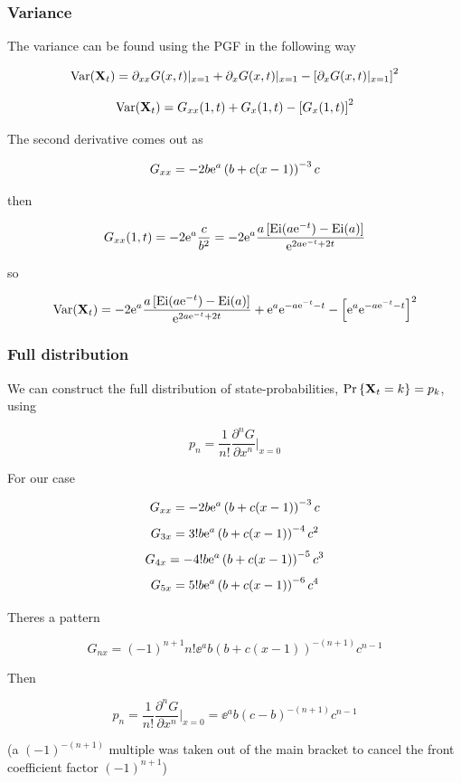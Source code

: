 \subsubsection{Variance}


The variance can be found using the PGF in the following way

$$\text{Var}({{\bf X}_t}) = \partial_{xx} G(x,t)\large|_{x=1} + \partial_{x} G(x,t)\large|_{x=1}  - \left[ \partial_{x} G(x,t)\large|_{x=1}\right]^2$$

$$\text{Var}({{\bf X}_t}) = G_{xx}(1,t) + G_x(1,t) - \left[ G_x(1,t)\right]^2$$


The second derivative comes out as 

$$G_{xx} =  -2b{\rm e}^a\left( b + c(x-1)\right)^{-3} c$$

then

$$G_{xx} (1,t) = -2{\rm e}^a \frac{ c}{b^2}    = -2 {\rm e}^a\frac{ {a\left[   \text{Ei}(a{\rm e}^{-t})  - \text{Ei}(a)  \right]} }{ {\rm e}^{2a {\rm e}^{-t} + 2t }} $$

so 

$$\text{Var}({{\bf X}_t}) =   -2 {\rm e}^a\frac{ {a\left[   \text{Ei}(a{\rm e}^{-t})  - \text{Ei}(a)  \right]} }{ {\rm e}^{2a {\rm e}^{-t} + 2t }}     +    {\rm e}^a {\rm e}^{-a{\rm e}^{-t}  - t}    - \left[{\rm e}^a {\rm e}^{-a{\rm e}^{-t}  - t}\right]^2 $$








\subsubsection{Full distribution}



We can construct the full distribution of state-probabilities, ${\text{Pr}\left\{{{\bf X}_t} = k\right\}} = p_k$, using 

$$p_n   =   \frac{1}{n!} \frac{\partial^n G}{\partial x^n }\bigg|_{x=0}$$


For our case

$$G_{xx} =  -2b{\rm e}^a\left( b + c(x-1)\right)^{-3} c$$
$$G_{3x} =  3!b{\rm e}^a\left( b + c(x-1)\right)^{-4} c^2$$
$$G_{4x} =  -4!b{\rm e}^a\left( b + c(x-1)\right)^{-5} c^3$$
$$G_{5x} =  5!b{\rm e}^a\left( b + c(x-1)\right)^{-6} c^4$$

Theres a pattern 

$$G_{nx}  = (-1)^{n+1} n!\ee^a b( b + c(x-1))^{-(n+1)} c^{n-1}$$

Then 


$$p_n   =   \frac{1}{n!} \frac{\partial^n G}{\partial x^n }\bigg|_{x=0} =  \ee^a b( c - b)^{-(n+1)} c^{n-1}$$

(a $(-1)^{-(n+1)}$ multiple was taken out of the main bracket to cancel the front coefficient factor $(-1)^{n+1}$)



